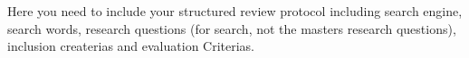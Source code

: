 
Here you need to include your structured review protocol including search engine, search words, research questions  (for search, not the masters research questions), inclusion createrias and evaluation Criterias. 